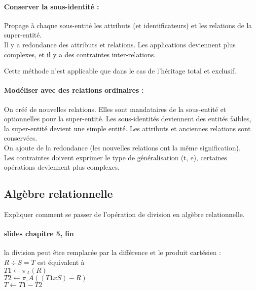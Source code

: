 \paragraph{Conserver la sous-identité :} Propage à chaque sous-entité les attributs 
(et identificateurs) et les relations de la super-entité.\\
Il y a redondance des attributs et relations. Les applications deviennent plus 
complexes, et il y a des contraintes inter-relations.

Cette méthode n'est applicable que dans le cas de l'héritage total et exclusif.

\paragraph{Modéliser avec des relations ordinaires :}
On créé de nouvelles relations. Elles sont mandataires de la sous-entité et 
optionnelles pour la super-entité.
Les sous-identités deviennent des entités faibles, la super-entité devient 
une simple entité.
Les attributs et anciennes relations sont conservées.\\

On ajoute de la redondance (les nouvelles relations ont la m\^eme signification).
Les contraintes doivent exprimer le type de généralisation (t, e), 
certaines opérations deviennent plus complexes.

\subsection{Algèbre relationnelle}
Expliquer comment se passer de l'opération de division en algèbre relationnelle.

\paragraph{slides chapitre 5, fin}
la division peut être remplacée par la différence et le produit cartésien :
$R \div S = T$ est équivalent à \\
$T1 \leftarrow \pi_{A}(R)$\\
$T2 \leftarrow \pi\_{A}((T1 x S) -R)$\\
$T \leftarrow T1 - T2 $\\

